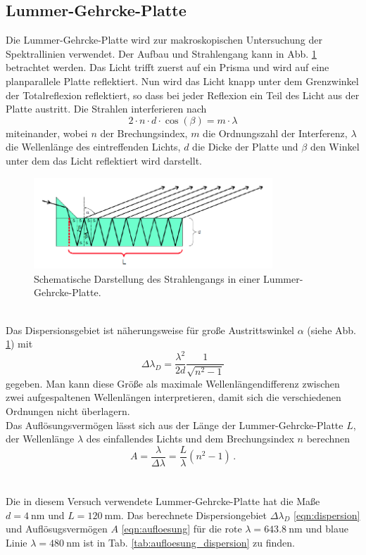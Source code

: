 \subsection{Lummer-Gehrcke-Platte}
Die Lummer-Gehrcke-Platte wird zur makroskopischen Untersuchung der Spektrallinien verwendet.
Der Aufbau und Strahlengang kann in Abb. \ref{fig:lummer} betrachtet werden.
Das Licht trifft zuerst auf ein Prisma und wird auf eine planparallele Platte reflektiert.
Nun wird das Licht knapp unter dem Grenzwinkel der Totalreflexion reflektiert, so dass bei jeder Reflexion ein Teil des Licht aus der Platte austritt.
Die Strahlen interferieren nach
\begin{equation*}
    2 \cdot n \cdot d \cdot \cos (\beta) = m \cdot \lambda
\end{equation*}
miteinander, wobei $n$ der Brechungsindex, $m$ die Ordnungszahl der Interferenz, $\lambda$ die Wellenlänge des eintreffenden Lichts, $d$ die Dicke der Platte und $\beta$ den Winkel unter dem das Licht reflektiert wird darstellt.
\begin{figure}
    \centering
    \includegraphics[width=0.8\textwidth]{content/data/lumer_gehrcke_platte.png}
    \caption{Schematische Darstellung des Strahlengangs in einer Lummer-Gehrcke-Platte. \cite[2]{anleitung}} %
    \label{fig:lummer}
\end{figure}
\\
Das Dispersionsgebiet ist näherungsweise für große Austrittswinkel $\alpha$ (siehe Abb. \ref{fig:lummer}) mit
\begin{equation}
    \Delta \lambda_D = \frac{\lambda^2}{2d} \frac{1}{\sqrt{n^2 -1}}
    \label{eqn:dispersion}
\end{equation}
gegeben.
Man kann diese Größe als maximale Wellenlängendifferenz zwischen zwei aufgespaltenen Wellenlängen interpretieren, damit sich die verschiedenen Ordnungen nicht überlagern.
\\
Das Auflösungsvermögen lässt sich aus der Länge der Lummer-Gehrcke-Platte $L$, der Wellenlänge $\lambda$ des einfallendes Lichts und dem Brechungsindex $n$ berechnen
\begin{equation}
    A = \frac{\lambda}{\Delta \lambda} = \frac{L}{\lambda} (n^2 - 1) \, .
    \label{eqn:aufloesung}
\end{equation}
\\
\\
Die in diesem Versuch verwendete Lummer-Gehrcke-Platte hat die Maße $d=\SI{4}{\nano\metre}$ und $L=\SI{120}{\milli\metre}$.
Das berechnete Dispersiongebiet $\Delta \lambda_D$ \eqref{eqn:dispersion} und Auflösugsvermögen $A$ \eqref{eqn:aufloesung} für die rote $\lambda = \SI{643,8}{\nano\metre}$ und blaue Linie $\lambda = \SI{480}{\nano\metre}$ ist in Tab. \ref{tab:aufloesung_dispersion} zu finden.

